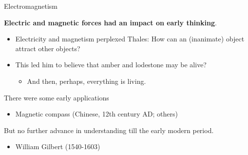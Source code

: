 \begin{frame}{Electromagnetism}

{\bf Electric and magnetic forces had an impact on early thinking}.\\
\begin{itemize}
   \item Electricity and magnetism perplexed Thales: How can an (inanimate) object attract other objects?
   \item This led him to believe that amber and lodestone may be alive?
     \begin{itemize}
        \item And then, perhaps, everything is living.\\
     \end{itemize}
\end{itemize}

\vspace{0.3cm}

There were some early applications
\begin{itemize}
   \item Magnetic compass (Chinese, 12th century AD; others)
\end{itemize}

\vspace{0.3cm}

But no further advance in understanding till the early modern period.
\begin{itemize}
    \item William Gilbert (1540-1603)
\end{itemize}

\end{frame}

%
%
%

